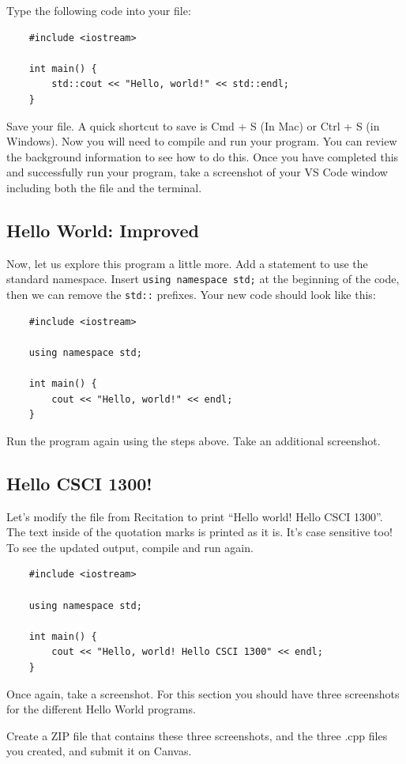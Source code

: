 Type the following code into your file:

\begin{verbatim}
    #include <iostream>

    int main() {
        std::cout << "Hello, world!" << std::endl;
    }
\end{verbatim}

Save your file.  A quick shortcut to save is Cmd + S (In Mac) or Ctrl + S (in Windows). Now you will need to compile and run your program. You can review the background information to see how to do this. Once you have completed this and successfully run your program, take a screenshot of your VS Code window including both the file and the terminal. 

\subsection{Hello World: Improved}

Now, let us explore this program a little more. Add a statement to use the standard namespace. Insert \texttt{using namespace std;} at the beginning of the code, then we can remove the \texttt{std::} prefixes. Your new code should look like this:

\begin{verbatim}
    #include <iostream>

    using namespace std;
    
    int main() {
        cout << "Hello, world!" << endl;
    }
\end{verbatim}

Run the program again using the steps above. Take an additional screenshot.

\subsection{Hello CSCI 1300!}

Let’s modify the file from Recitation to print ``Hello world! Hello CSCI 1300”. The text inside of the quotation marks is printed as it is. It’s case sensitive too! To see the updated output, compile and run again.

\begin{verbatim}
    #include <iostream>

    using namespace std;
    
    int main() {
        cout << "Hello, world! Hello CSCI 1300" << endl;
    }
\end{verbatim}

Once again, take a screenshot. For this section you should have three screenshots for the different Hello World programs.

Create a ZIP file that contains these three screenshots, and the three .cpp files you created, and submit it on Canvas.




